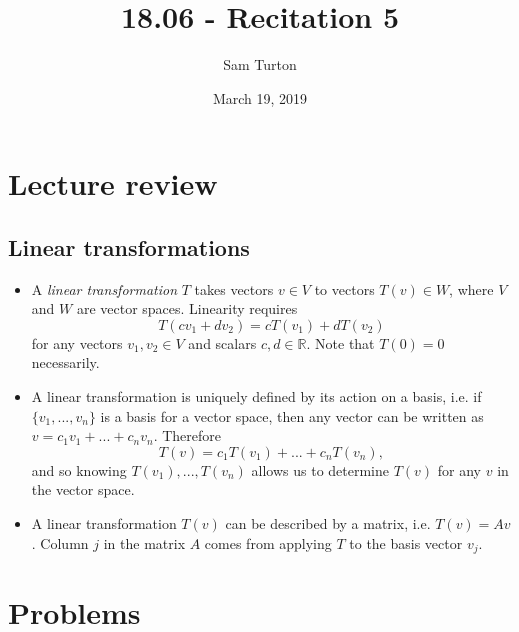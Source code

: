 \documentclass[11pt]{article}
\title{18.06 - Recitation 5}
\author{Sam Turton}
\date{March 19, 2019}
\begin{document}
\maketitle

\section{Lecture review}
\subsection{Linear transformations}
\begin{itemize}
\item A \emph{linear transformation} $T$ takes vectors $v\in V$ to vectors $T(v)\in W$, where $V$ and $W$ are vector spaces. Linearity requires
$$\boxed{T(cv_1+dv_2) = cT(v_1) + dT(v_2)}$$
for any vectors $v_1, v_2 \in V$ and scalars $c,d \in \mathbb{R}$. Note that $T(0)=0$ necessarily.
\item A linear transformation is uniquely defined by its action on a basis, i.e. if $\{v_1,...,v_n\}$ is a basis for a vector space, then any vector can be written as $v=c_1v_1 + ... + c_nv_n$. Therefore 
$$T(v) = c_1T(v_1)+...+c_nT(v_n),$$
and so knowing $T(v_1),..., T(v_n)$ allows us to determine $T(v)$ for any $v$ in the vector space.
\item A linear transformation $T(v)$ can be described by a matrix, i.e. $T(v) = Av$. Column $j$ in the matrix $A$ comes from applying $T$ to the basis vector $v_j$. 
\end{itemize}

\newpage
\section{Problems}
\end{document}
